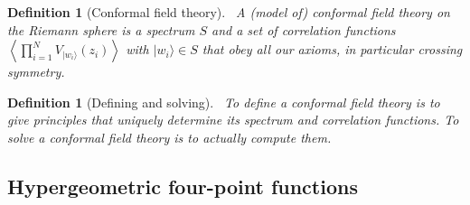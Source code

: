 \documentclass[12pt, a4paper]{article}
\theoremstyle{break}
\newtheorem{defn}[exo]{Definition}
\begin{document}
\begin{defn}[Conformal field theory]
~\label{def:cft}
A (model of) conformal field theory on the Riemann sphere is a spectrum $S$ and a set of correlation functions $\left<\prod_{i=1}^N V_{|w_i\rangle}(z_i)\right>$ with $|w_i\rangle\in S$ that obey all our axioms, in particular crossing symmetry. 
\end{defn}

\begin{defn}[Defining and solving]
 ~\label{def:def}
 To define a conformal field theory is to give principles that uniquely determine its spectrum and correlation functions.
 To solve a conformal field theory is to actually compute them.
\end{defn}

\subsection{Hypergeometric four-point functions}
\end{document}
